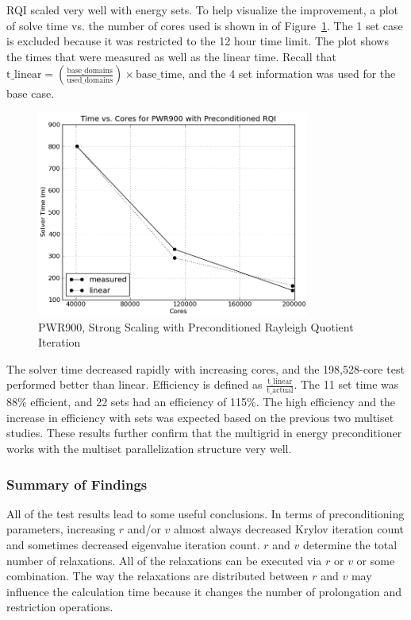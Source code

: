 RQI scaled very well with energy sets. To help visualize the improvement, a plot of solve time vs. the number of cores used is shown in of Figure~\ref{fig:PWRprecondRQI}. The 1 set case is excluded because it was restricted to the 12 hour time limit. The plot shows the times that were measured as well as the linear time. Recall that $\text{t\_linear} = (\frac{\text{base\_domains}}{\text{used\_domains}}) \times \text{base\_time}$, and the 4 set information was used for the base case. 
%
\begin{figure}[!ht]
    \begin{center}
      \includegraphics [width=0.8\textwidth, height=0.5\textheight] {PWRPrecondRQI}
   \end{center}
   \caption{PWR900, Strong Scaling with Preconditioned Rayleigh Quotient Iteration}
   \label{fig:PWRprecondRQI}
\end{figure}

The solver time decreased rapidly with increasing cores, and the 198,528-core test performed better than linear. Efficiency is defined as $\frac{\text{t\_linear}}{\text{t\_actual}}$. The 11 set time was 88\% efficient, and 22 sets had an efficiency of 115\%. The high efficiency and the increase in efficiency with sets was expected based on the previous two multiset studies. These results further confirm that the multigrid in energy preconditioner works with the multiset parallelization structure very well.

\subsubsection{Summary of Findings}
All of the test results lead to some useful conclusions. In terms of preconditioning parameters, increasing $r$ and/or $v$ almost always decreased Krylov iteration count and sometimes decreased eigenvalue iteration count. $r$ and $v$ determine the total number of relaxations. All of the relaxations can be executed via $r$ or $v$ or some combination. The way the relaxations are distributed between $r$ and $v$ may influence the calculation time because it changes the number of prolongation and restriction operations. 

